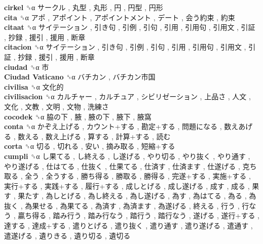 \textbf{cirkel} ␝α   サークル ,  丸型 ,  丸形 ,  円 ,  円型 ,  円形   \\
\textbf{cita} ␝α   アポ ,  アポイント ,  アポイントメント ,  デート ,  会う約束 ,  約束   \\
\textbf{citaat} ␝α   サイテーション ,  引き句 ,  引例 ,  引句 ,  引用 ,  引用句 ,  引用文 ,  引証 ,  抄録 ,  援引 ,  援用 ,  断章   \\
\textbf{citacion} ␝α   サイテーション ,  引き句 ,  引例 ,  引句 ,  引用 ,  引用句 ,  引用文 ,  引証 ,  抄録 ,  援引 ,  援用 ,  断章   \\
\textbf{ciudad} ␝α   市   \\
\textbf{Ciudad Vaticano} ␝α   バチカン ,  バチカン市国   \\
\textbf{civilisa} ␝α   文化的   \\
\textbf{civilisacion} ␝α   カルチャー ,  カルチュア ,  シビリゼーション ,  上品さ ,  人文 ,  文化 ,  文教 ,  文明 ,  文物 ,  洗練さ   \\
\textbf{cocodek} ␝α   脇の下 ,  腋 ,  腋の下 ,  腋下 ,  腋窩   \\
\textbf{conta} ␝α   かぞえ上げる ,  カウント+する ,  勘定+する ,  問題になる ,  数えあげる ,  数える ,  数え上げる ,  算する ,  計算+する ,  読む   \\
\textbf{corta} ␝α   切る ,  切れる ,  安い ,  摘み取る ,  短縮+する   \\
\textbf{cumpli} ␝α   し果てる ,  し終える ,  し遂げる ,  やり切る ,  やり抜く ,  やり通す ,  やり遂げる ,  仕はてる ,  仕抜く ,  仕果てる ,  仕済す ,  仕済ます ,  仕遂げる ,  克ち取る ,  全う ,  全うする ,  勝ち得る ,  勝取る ,  勝得る ,  完遂+する ,  実施+する ,  実行+する ,  実践+する ,  履行+する ,  成しとげる ,  成し遂げる ,  成す ,  成る ,  果す ,  果たす ,  為しとげる ,  為し終える ,  為し遂げる ,  為す ,  為はてる ,  為る ,  為抜く ,  為果せる ,  為果てる ,  為済す ,  為済ます ,  為遂げる ,  終える ,  行う ,  行なう ,  贏ち得る ,  踏み行う ,  踏み行なう ,  踏行う ,  踏行なう ,  遂げる ,  遂行+する ,  達する ,  達成+する ,  遣りとげる ,  遣り抜く ,  遣り通す ,  遣り遂げる ,  遣通す ,  遣遂げる ,  遺りきる ,  遺り切る ,  遺切る   \\
